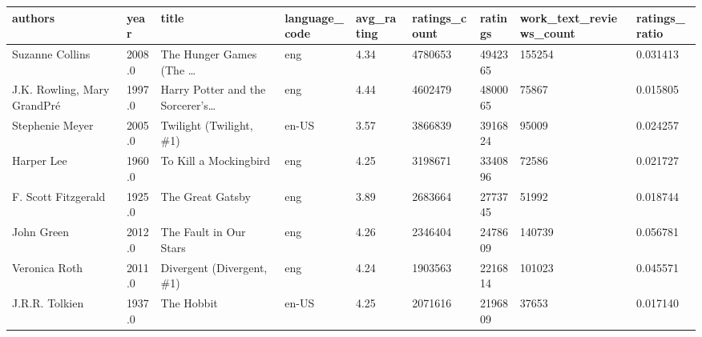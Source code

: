 \documentclass[handout]{beamer}
\begin{document}
\begin{frame}


\begin{table}
\begin{tabular}{lHlHHHHHZ}
\toprule
                     authors &  year &                                              title & language\_code &  avg\_rating &  ratings\_count &  ratings &  work\_text\_reviews\_count &  ratings\_ratio \\
\midrule
             Suzanne Collins &                     2008.0 &            The Hunger Games (The \ldots &           eng &            4.34 &        4780653 &             4942365 &                   155254 &       0.031413 \\
 J.K. Rowling, Mary GrandPr\'e &                     1997.0 &  Harry Potter and the Sorcerer's\ldots &           eng &            4.44 &        4602479 &             4800065 &                    75867 &       0.015805 \\
             Stephenie Meyer &                     2005.0 &                            Twilight (Twilight, \#1) &         en-US &            3.57 &        3866839 &             3916824 &                    95009 &       0.024257 \\
                  Harper Lee &                     1960.0 &                              To Kill a Mockingbird &           eng &            4.25 &        3198671 &             3340896 &                    72586 &       0.021727 \\
         F. Scott Fitzgerald &                     1925.0 &                                   The Great Gatsby &           eng &            3.89 &        2683664 &             2773745 &                    51992 &       0.018744 \\
                  John Green &                     2012.0 &                             The Fault in Our Stars &           eng &            4.26 &        2346404 &             2478609 &                   140739 &       0.056781 \\
               Veronica Roth &                     2011.0 &                          Divergent (Divergent, \#1) &           eng &            4.24 &        1903563 &             2216814 &                   101023 &       0.045571 \\
              J.R.R. Tolkien &                     1937.0 &                                         The Hobbit &         en-US &            4.25 &        2071616 &             2196809 &                    37653 &       0.017140 \\

\end{tabular}
\end{table}
\end{frame}
\end{document}
